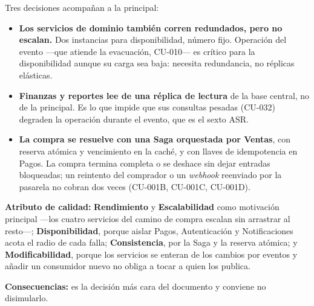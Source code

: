 \medskip
Tres decisiones acompañan a la principal:

\begin{itemize}
  \item \textbf{Los servicios de dominio también corren redundados, pero no
        escalan.} Dos instancias para disponibilidad, número fijo. Operación del
        evento ---que atiende la evacuación, CU-010--- es crítico para la
        disponibilidad aunque su carga sea baja: necesita redundancia, no
        réplicas elásticas.
  \item \textbf{Finanzas y reportes lee de una réplica de lectura} de la base
        central, no de la principal. Es lo que impide que sus consultas pesadas
        (CU-032) degraden la operación durante el evento, que es el sexto ASR.
  \item \textbf{La compra se resuelve con una Saga orquestada por Ventas}, con
        reserva atómica y vencimiento en la caché, y con llaves de idempotencia
        en Pagos. La compra termina completa o se deshace sin dejar entradas
        bloqueadas; un reintento del comprador o un \textit{webhook} reenviado
        por la pasarela no cobran dos veces (CU-001B, CU-001C, CU-001D).
\end{itemize}

\textbf{Atributo de calidad:} \textbf{Rendimiento} y \textbf{Escalabilidad}
como motivación principal ---los cuatro servicios del camino de compra escalan
sin arrastrar al resto---; \textbf{Disponibilidad}, porque aislar Pagos,
Autenticación y Notificaciones acota el radio de cada falla;
\textbf{Consistencia}, por la Saga y la reserva atómica; y
\textbf{Modificabilidad}, porque los servicios se enteran de los cambios por
eventos y añadir un consumidor nuevo no obliga a tocar a quien los publica.

\textbf{Consecuencias:} es la decisión más cara del documento y conviene no
disimularlo.

